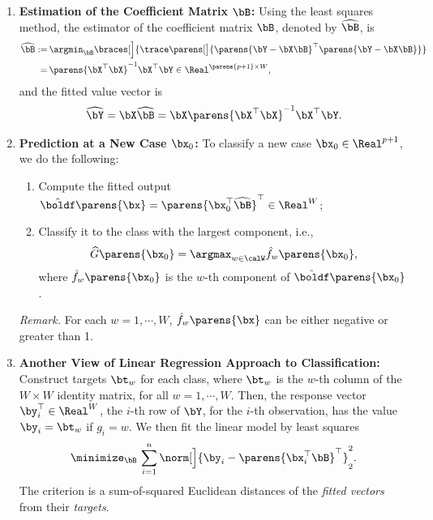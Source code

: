\documentclass[12pt]{article}
\begin{document}
\begin{enumerate}[label=\textbf{\arabic*.}]
	\item \textbf{Estimation of the Coefficient Matrix $\bB$:} Using the least squares method, the estimator of the coefficient matrix $\bB$, denoted by $\widehat{\bB}$, is 
	\begin{align*}
		\widehat{\bB} := & \, \argmin_{\bB} \braces[\Big]{\trace \parens[\big]{\parens{\bY - \bX \bB}^\top \parens{\bY - \bX \bB}}} \nonumber \\ 
		= & \, \parens{\bX^\top \bX}^{-1} \bX^\top \bY \in \Real^{ \parens{p+1} \times W }, 
	\end{align*}
	and the fitted value vector is 
	\begin{align*}
		\widehat{\bY} = \bX \widehat{\bB} = \bX \parens{\bX^\top \bX}^{-1} \bX^\top \bY. 
	\end{align*}
	
	\item \textbf{Prediction at a New Case $\bx_0$:} To classify a new case $\bx_0 \in \Real^{p+1}$, we do the following: 
	\begin{enumerate}
		\item Compute the fitted output $ \hat{\boldf} \parens{\bx} = \parens{\bx_0^\top \widehat{\bB}}^\top \in \Real^W$; 
		\item Classify it to the class with the largest component, i.e., 
		\begin{align}\label{eq-linear-reg-argmax}
			\widehat{G} \parens{\bx_0} = \argmax_{w \in \calW} \hat{f}_w \parens{\bx_0}, 
		\end{align}
		where $\hat{f}_w \parens{\bx_0}$ is the $w$-th component of $\hat{\boldf} \parens{\bx_0}$. 
	\end{enumerate}
	
	\textit{Remark.} For each $w = 1, \cdots, W$, $\hat{f}_w \parens{\bx}$ can be either negative or greater than 1. 
	
	\item \textbf{Another View of Linear Regression Approach to Classification:} Construct targets $\bt_w$ for each class, where $\bt_w$ is the $w$-th column of the $W \times W$ identity matrix, for all $w = 1, \cdots, W$. Then, the response vector $\by_i^\top \in \Real^W$, the $i$-th row of $\bY$, for the $i$-th observation, has the value $\by_i = \bt_w$ if $g_i = w$. We then fit the linear model by least squares 
	\begin{align*}
		\minimize_{\bB} \, \sum_{i=1}^n \norm[\Big]{\by_i - \parens{\bx_i^\top \bB}^\top}_2^2. 
	\end{align*}
	The criterion is a sum-of-squared Euclidean distances of the \textit{fitted vectors} from their \textit{targets}. 
	

\end{enumerate}
\end{document}

